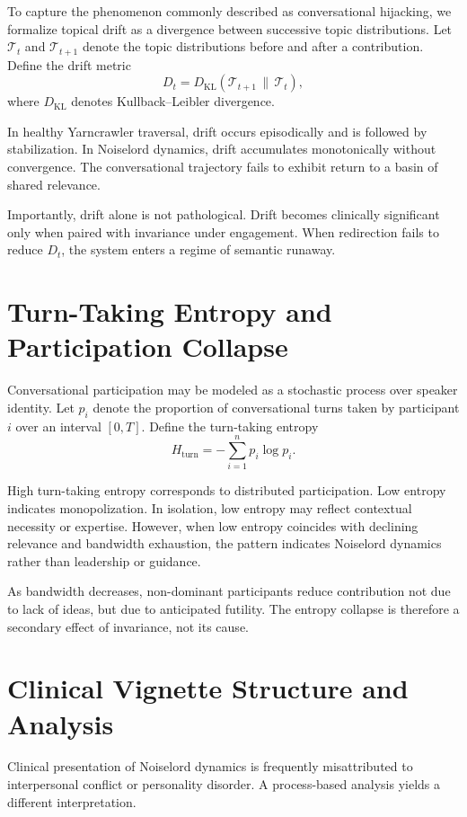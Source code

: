\documentclass[12pt]{article}
\theoremstyle{remark}
\begin{document}
To capture the phenomenon commonly described as conversational hijacking, we formalize topical drift as a divergence between successive topic distributions. Let $\mathcal{T}_t$ and $\mathcal{T}_{t+1}$ denote the topic distributions before and after a contribution. Define the drift metric
\[
D_t = D_{\mathrm{KL}}(\mathcal{T}_{t+1} \,\|\, \mathcal{T}_t),
\]
where $D_{\mathrm{KL}}$ denotes Kullback--Leibler divergence.

In healthy Yarncrawler traversal, drift occurs episodically and is followed by stabilization. In Noiselord dynamics, drift accumulates monotonically without convergence. The conversational trajectory fails to exhibit return to a basin of shared relevance.

Importantly, drift alone is not pathological. Drift becomes clinically significant only when paired with invariance under engagement. When redirection fails to reduce $D_t$, the system enters a regime of semantic runaway.

\section{Turn-Taking Entropy and Participation Collapse}

Conversational participation may be modeled as a stochastic process over speaker identity. Let $p_i$ denote the proportion of conversational turns taken by participant $i$ over an interval $[0,T]$. Define the turn-taking entropy
\[
H_{\mathrm{turn}} = -\sum_{i=1}^n p_i \log p_i.
\]

High turn-taking entropy corresponds to distributed participation. Low entropy indicates monopolization. In isolation, low entropy may reflect contextual necessity or expertise. However, when low entropy coincides with declining relevance and bandwidth exhaustion, the pattern indicates Noiselord dynamics rather than leadership or guidance.

As bandwidth decreases, non-dominant participants reduce contribution not due to lack of ideas, but due to anticipated futility. The entropy collapse is therefore a secondary effect of invariance, not its cause.

\section{Clinical Vignette Structure and Analysis}

Clinical presentation of Noiselord dynamics is frequently misattributed to interpersonal conflict or personality disorder. A process-based analysis yields a different interpretation.
\end{document}
